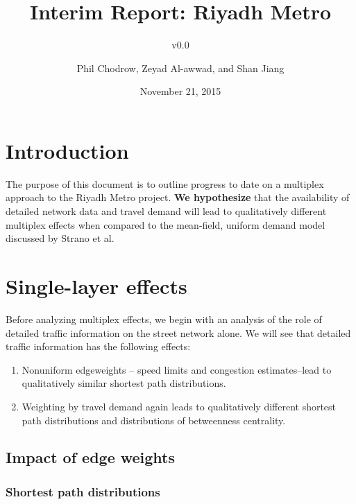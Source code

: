 \documentclass[english]{scrartcl}
\title{Interim Report: Riyadh Metro}
\subtitle{v0.0}
\author{Phil Chodrow, Zeyad Al-awwad, and Shan Jiang}
\date{November 21, 2015}
\begin{document}
\maketitle

\section{Introduction}
	The purpose of this document is to outline progress to date on a multiplex approach to the Riyadh Metro project. \textbf{We hypothesize} that the availability of detailed network data and travel demand will lead to qualitatively different multiplex effects when compared to the mean-field, uniform demand model discussed by Strano et al.   
\section{Single-layer effects}
	Before analyzing multiplex effects, we begin with an analysis of the role of detailed traffic information on the street network alone. We will see that detailed traffic information has the following effects:
	\begin{enumerate}
		\item Nonuniform edgeweights -- speed limits and congestion estimates--lead to qualitatively similar shortest path distributions.
		\item Weighting by travel demand again leads to qualitatively different shortest path distributions and distributions of betweenness centrality. 
	\end{enumerate}
	\subsection{Impact of edge weights}
		\subsubsection{Shortest path distributions}
\end{document}
